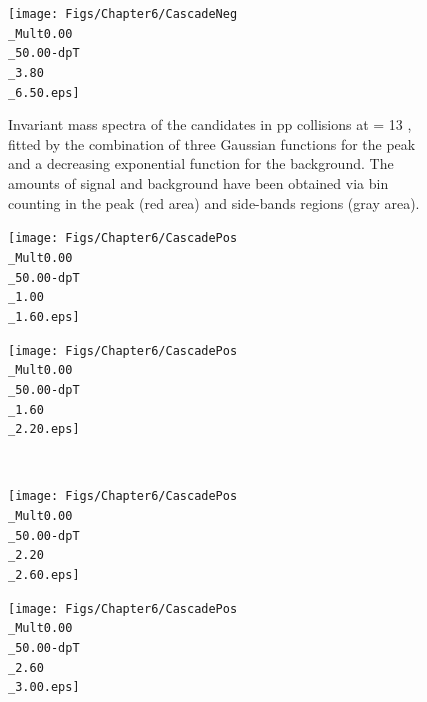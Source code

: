 \begin{figure}[!p]
\begin{minipage}[t]{.5\textwidth}
        \texttt{[image: Figs/Chapter6/CascadeNeg\\\_Mult0.00\\\_50.00-dpT\\\_3.80\\\_6.50.eps]}
    \end{minipage}
    \hfill
\caption{Invariant mass spectra of the \rmOmegaM candidates in pp collisions at \sqrtS = 13 \tev, fitted by the combination of three Gaussian functions for the peak and a decreasing exponential function for the background. The amounts of signal and background have been obtained via bin counting in the peak (red area) and side-bands regions (gray area).}
	\label{fig:InvMassOmegaMinusVsPt}
\end{figure}

\begin{figure}[!p]
	\begin{minipage}[t]{.5\textwidth}
        \hspace*{-1.5cm}
        \texttt{[image: Figs/Chapter6/CascadePos\\\_Mult0.00\\\_50.00-dpT\\\_1.00\\\_1.60.eps]}
    \end{minipage}
    \hfill
    \begin{minipage}[t]{.5\textwidth}
        \hspace*{.5cm}
        \texttt{[image: Figs/Chapter6/CascadePos\\\_Mult0.00\\\_50.00-dpT\\\_1.60\\\_2.20.eps]}
    \end{minipage}\\
    \begin{minipage}[t]{.5\textwidth}
        \hspace*{-1.5cm}
        \texttt{[image: Figs/Chapter6/CascadePos\\\_Mult0.00\\\_50.00-dpT\\\_2.20\\\_2.60.eps]}
    \end{minipage}
    \hfill
    \begin{minipage}[t]{.5\textwidth}
        \hspace*{.5cm}
        \texttt{[image: Figs/Chapter6/CascadePos\\\_Mult0.00\\\_50.00-dpT\\\_2.60\\\_3.00.eps]}

\end{minipage}
\end{figure}
